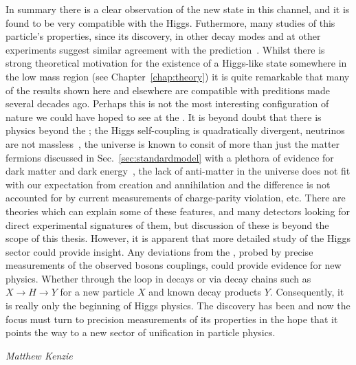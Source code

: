 In summary there is a clear observation of the new state in this channel, and it is found to be very compatible with the \SM Higgs. Futhermore, many studies of this particle's properties, since its discovery, in other decay modes and at other experiments suggest similar agreement with the \SM prediction~. Whilst there is strong theoretical motivation for the existence of a Higgs-like state somewhere in the low mass region (see Chapter~\ref{chap:theory}) it is quite remarkable that many of the results shown here and elsewhere are compatible with preditions made several decades ago. Perhaps this is not the most interesting configuration of nature we could have hoped to see at the \LHC. It is beyond doubt that there is physics beyond the \SM; the Higgs self-coupling is quadratically divergent, neutrinos are not massless~, the universe is known to consit of more than just the matter fermions discussed in Sec.~\ref{sec:standardmodel} with a plethora of evidence for dark matter and dark energy~, the lack of anti-matter in the universe does not fit with our expectation from creation and annihilation and the difference is not accounted for by current measurements of charge-parity violation, etc. There are theories which can explain some of these features, and many detectors looking for direct experimental signatures of them, but discussion of these is beyond the scope of this thesis. However, it is apparent that more detailed study of the Higgs sector could provide insight. Any deviations from the \SM, probed by precise measurements of the observed bosons couplings, could provide evidence for new physics. Whether through the loop in \Hgg decays or via decay chains such as $X\rightarrow H\rightarrow Y$ for a new particle $X$ and known decay products $Y$. Consequently, it is really only the beginning of Higgs physics. The discovery has been and now the focus must turn to precision measurements of its properties in the hope that it points the way to a new sector of unification in particle physics.

\hfill\textit{Matthew Kenzie}
